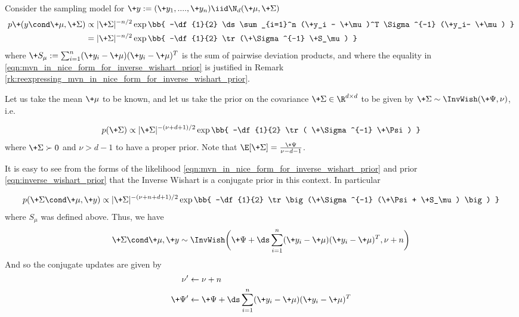 \documentclass{article} %
\begin{document}
\begin{example}{} \label{ex:inverse_wishart_prior}



Consider the sampling model for $\+y :=(\+y_1, ....,\+y_n) \iid \N_d(\+\mu,  \+\Sigma)$
\begin{align}
p\+(y \cond \+\mu, \+\Sigma) & \propto | \+\Sigma |^{-n/2} \exp \bb{ -\df{1}{2} \ds\sum_{i=1}^n (\+y_i - \+\mu)^T  \Sigma^{-1} (\+y_i- \+\mu) } \nonumber \\
& = | \+\Sigma |^{-n/2} \exp \bb{ -\df{1}{2} \tr(\+\Sigma^{-1} \+S_\mu)  }\label{eqn:mvn_in_nice_form_for_inverse_wishart_prior}
\end{align}
where $\+S_\mu := \sum_{i=1}^n (\+y_i - \+\mu) (\+y_i - \+\mu)^T$ is the sum of pairwise deviation products,  and where the equality in \eqref{eqn:mvn_in_nice_form_for_inverse_wishart_prior}  is justified in Remark \ref{rk:reexpressing_mvn_in_nice_form_for_inverse_wishart_prior}.

Let us take the mean $\+\mu$ to be known,  and let us take the prior on the covariance $\+\Sigma \in \R^{d \times d}$ to be given by $\+\Sigma \sim \InvWish(\+\Psi, \nu)$, i.e.

\begin{align}
p(\+\Sigma) \propto | \+\Sigma|^{-(\nu+d +1) /2}  \exp \bb{ -\df{1}{2} \tr ( \+\Sigma^{-1} \+\Psi) } 
\label{eqn:inverse_wishart_prior}
\end{align}
where $\+\Sigma \succ 0$ and $\nu > d-1$ to have a proper prior.   Note that $\E[\+\Sigma] = \frac{\+\Psi}{\nu -d -1}$.

It is easy to see from the forms of the likelihood \eqref{eqn:mvn_in_nice_form_for_inverse_wishart_prior} and prior \eqref{eqn:inverse_wishart_prior} that the Inverse Wishart is a conjugate prior in this context.  In particular

\begin{align}
p(\+\Sigma \cond \+\mu,  \+y) \propto | \+\Sigma|^{-(\nu+ n + d +1) /2}  \exp \bb{ -\df{1}{2} \tr \big(\+\Sigma^{-1} (\+\Psi + \+S_\mu) \big) } 
\label{eqn:inverse_wishart_posterior}
\end{align}
where $S_\mu$ was defined above.  Thus,  we have 
\[ \+\Sigma \cond \+\mu,  \+y \sim \InvWish \bigg( \+\Psi +  \ds\sum_{i=1}^n (\+y_i - \+\mu) (\+y_i - \+\mu)^T,  \nu + n \bigg) \]
And so the conjugate updates are given by
\begin{align}
\nu^\prime &\leftarrow  \nu + n \\
\+\Psi^\prime &\leftarrow \+\Psi + \ds\sum_{i=1}^n (\+y_i - \+\mu) (\+y_i - \+\mu)^T
\end{align}
\end{example}
\end{document}
